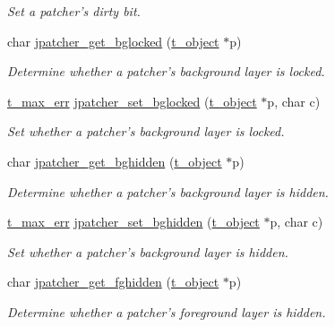 \begin{DoxyCompactItemize}
\begin{DoxyCompactList}\small\item\em Set a patcher's dirty bit. \item\end{DoxyCompactList}\item 
char \hyperlink{group__jpatcher_ga38c0179d1eb95d96f473cfde94164be4}{jpatcher\_\-get\_\-bglocked} (\hyperlink{structt__object}{t\_\-object} $\ast$p)
\begin{DoxyCompactList}\small\item\em Determine whether a patcher's background layer is locked. \item\end{DoxyCompactList}\item 
\hyperlink{group__datatypes_ga73edaae82b318855cc09fac994918165}{t\_\-max\_\-err} \hyperlink{group__jpatcher_ga8bdd915ec7c3de07c7c90c33b6b516bf}{jpatcher\_\-set\_\-bglocked} (\hyperlink{structt__object}{t\_\-object} $\ast$p, char c)
\begin{DoxyCompactList}\small\item\em Set whether a patcher's background layer is locked. \item\end{DoxyCompactList}\item 
char \hyperlink{group__jpatcher_gabb79c4b3f29dd61ad9725a2a8141b312}{jpatcher\_\-get\_\-bghidden} (\hyperlink{structt__object}{t\_\-object} $\ast$p)
\begin{DoxyCompactList}\small\item\em Determine whether a patcher's background layer is hidden. \item\end{DoxyCompactList}\item 
\hyperlink{group__datatypes_ga73edaae82b318855cc09fac994918165}{t\_\-max\_\-err} \hyperlink{group__jpatcher_gaace70353f26b52b10d5926ab0a6c9395}{jpatcher\_\-set\_\-bghidden} (\hyperlink{structt__object}{t\_\-object} $\ast$p, char c)
\begin{DoxyCompactList}\small\item\em Set whether a patcher's background layer is hidden. \item\end{DoxyCompactList}\item 
char \hyperlink{group__jpatcher_ga164ac5db6109ab48fb0ca833263da801}{jpatcher\_\-get\_\-fghidden} (\hyperlink{structt__object}{t\_\-object} $\ast$p)
\begin{DoxyCompactList}\small\item\em Determine whether a patcher's foreground layer is hidden. \item\end{DoxyCompactList}\item 

\end{DoxyCompactItemize}
